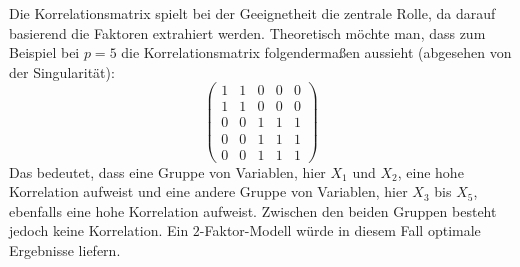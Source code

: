 \documentclass[11pt]{scrartcl}
\begin{document}
	Die Korrelationsmatrix spielt bei der Geeignetheit die zentrale Rolle, da darauf basierend die Faktoren
	extrahiert werden. Theoretisch möchte man, dass zum Beispiel bei $p=5$
	die Korrelationsmatrix folgendermaßen aussieht (abgesehen von der Singularität):
	\begin{equation}
	\label{Wünschenswerte Korrelationsmatrix}
			\begin{pmatrix}
			1 & 1 & 0 & 0 & 0 \\
			1 & 1 & 0 & 0 & 0 \\
			0 & 0 & 1 & 1 & 1 \\
			0 & 0 & 1 & 1 & 1 \\
			0 & 0 & 1 & 1 & 1
		\end{pmatrix}
	\end{equation}
	Das bedeutet, dass eine Gruppe von Variablen, hier $X_1$ und $X_2$, eine hohe
	Korrelation aufweist und eine andere Gruppe von Variablen, hier $X_3$ bis $X_5$,
	ebenfalls eine hohe Korrelation aufweist. Zwischen den beiden Gruppen besteht jedoch
	keine Korrelation. Ein $2$-Faktor-Modell würde in diesem Fall optimale Ergebnisse liefern.
	
%	
	
\end{document}
